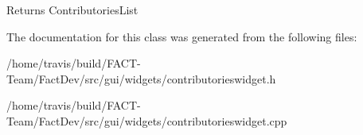 \begin{DoxyReturn}{Returns}
Contributories\-List 
\end{DoxyReturn}


The documentation for this class was generated from the following files\-:\begin{DoxyCompactItemize}
\item 
/home/travis/build/\-F\-A\-C\-T-\/\-Team/\-Fact\-Dev/src/gui/widgets/contributorieswidget.\-h\item 
/home/travis/build/\-F\-A\-C\-T-\/\-Team/\-Fact\-Dev/src/gui/widgets/contributorieswidget.\-cpp\end{DoxyCompactItemize}
